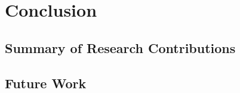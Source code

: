 \chapter{Conclusion}
\label{chap:conclusion}

\section{Summary of Research Contributions}


\section{Future Work}
